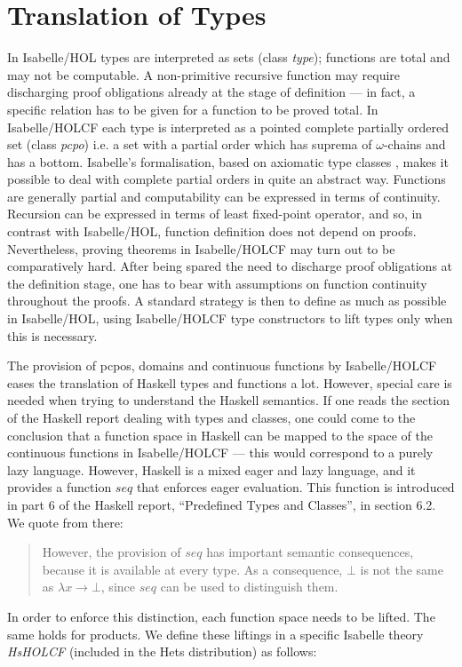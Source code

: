 \documentclass{llncs}
\begin{document}
\section{Translation of Types}
\label{sec:types}


In Isabelle/HOL types are interpreted as sets (class \emph{type});
functions are total and may not be computable. A non-primitive
recursive function may require discharging proof obligations already
at the stage of definition --- in fact, a specific relation has to be
given for a function to be proved total. In Isabelle/HOLCF each type
is interpreted as a pointed complete partially ordered set (class
\emph{pcpo}) i.e. a set with a partial order which has suprema of
$\omega$-chains and has a bottom. Isabelle's formalisation, based on
axiomatic type classes \cite{Wenzel}, makes it possible to deal with
complete partial orders in quite an abstract way.  Functions are
generally partial and computability can be expressed in terms of
continuity. Recursion can be expressed in terms of least fixed-point
operator, and so, in contrast with Isabelle/HOL, function definition
does not depend on proofs.  Nevertheless, proving theorems in
Isabelle/HOLCF may turn out to be comparatively hard.  After being
spared the need to discharge proof obligations at the definition
stage, one has to bear with assumptions on function continuity
throughout the proofs. A standard strategy is then to define as much
as possible in Isabelle/HOL, using Isabelle/HOLCF type constructors to
lift types only when this is necessary.

The provision of pcpos, domains and continuous functions by
Isabelle/HOLCF eases the translation of Haskell types and functions a
lot.  However, special care is needed when trying to understand the
Haskell semantics. If one reads the section of the Haskell report
dealing with types and classes, one could come to the conclusion that
a function space in Haskell can be mapped to the space of the
continuous functions in Isabelle/HOLCF --- this would correspond to a
purely lazy language. However, Haskell is a mixed eager and lazy
language, and it provides a function $seq$ that enforces eager
evaluation. This function is introduced in part 6 of the Haskell
report, ``Predefined Types and Classes'', in section 6.2.  We quote
from there:
\begin{quote}
  However, the provision of $seq$ has important semantic consequences,
  because it is available at every type. As a consequence, $\bot$ is
  not the same as $\lambda x \rightarrow \bot$, since $seq$ can be
  used to distinguish them.
\end{quote}
In order to enforce this distinction, each function space needs to be
lifted. The same holds for products.  We define these liftings in a
specific Isabelle theory \emph{HsHOLCF} (included in the Hets
distribution) as follows:
\end{document}
